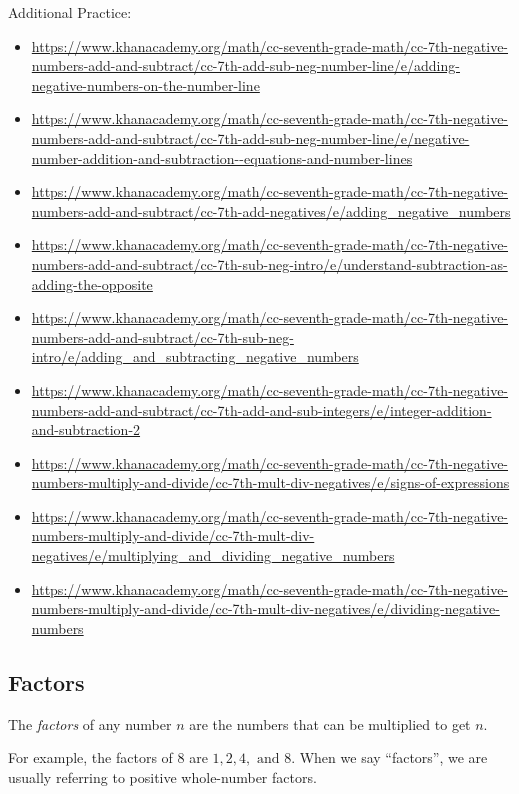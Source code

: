 Additional Practice: 
\begin{itemize}
	\item {\footnotesize \url{https://www.khanacademy.org/math/cc-seventh-grade-math/cc-7th-negative-numbers-add-and-subtract/cc-7th-add-sub-neg-number-line/e/adding-negative-numbers-on-the-number-line}}
	\item {\footnotesize \url{https://www.khanacademy.org/math/cc-seventh-grade-math/cc-7th-negative-numbers-add-and-subtract/cc-7th-add-sub-neg-number-line/e/negative-number-addition-and-subtraction--equations-and-number-lines}}
	\item {\footnotesize \url{https://www.khanacademy.org/math/cc-seventh-grade-math/cc-7th-negative-numbers-add-and-subtract/cc-7th-add-negatives/e/adding_negative_numbers}}
	\item {\footnotesize \url{https://www.khanacademy.org/math/cc-seventh-grade-math/cc-7th-negative-numbers-add-and-subtract/cc-7th-sub-neg-intro/e/understand-subtraction-as-adding-the-opposite}}
	\item {\footnotesize \url{https://www.khanacademy.org/math/cc-seventh-grade-math/cc-7th-negative-numbers-add-and-subtract/cc-7th-sub-neg-intro/e/adding_and_subtracting_negative_numbers}}
	\item {\footnotesize \url{https://www.khanacademy.org/math/cc-seventh-grade-math/cc-7th-negative-numbers-add-and-subtract/cc-7th-add-and-sub-integers/e/integer-addition-and-subtraction-2}}

	\item {\footnotesize \url{https://www.khanacademy.org/math/cc-seventh-grade-math/cc-7th-negative-numbers-multiply-and-divide/cc-7th-mult-div-negatives/e/signs-of-expressions}}	
	\item {\footnotesize \url{https://www.khanacademy.org/math/cc-seventh-grade-math/cc-7th-negative-numbers-multiply-and-divide/cc-7th-mult-div-negatives/e/multiplying_and_dividing_negative_numbers}}	
	\item {\footnotesize \url{https://www.khanacademy.org/math/cc-seventh-grade-math/cc-7th-negative-numbers-multiply-and-divide/cc-7th-mult-div-negatives/e/dividing-negative-numbers}}	
\end{itemize}




\newpage 
\subsection{Factors}
\begin{definition}[Factor]
The \emph{factors} of any number \(n\) are the numbers that can be multiplied to get \(n\).  

For example, the factors of \(8\) are \(1, 2, 4, \text{ and } 8\). When we say ``factors'', we are usually referring to positive whole-number factors. 
\end{definition}

